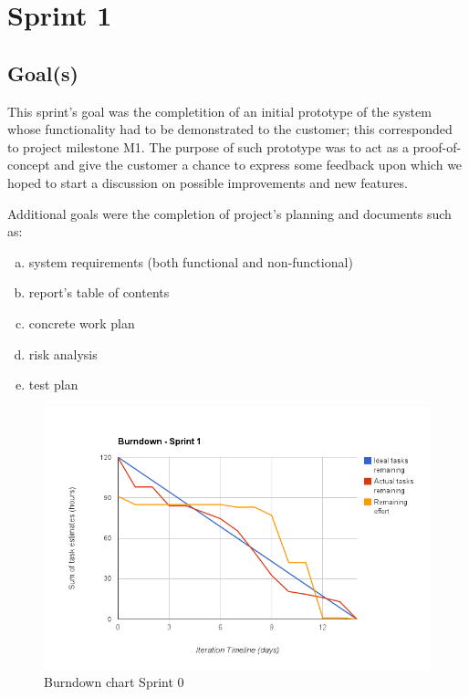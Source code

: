 
\chapter{Sprint 1}
\label{Sprint1}

\section{Goal(s)}

This sprint's goal was the completition of an initial prototype of the system whose functionality
had to be demonstrated to the customer; this corresponded to project milestone M1.
The purpose of such prototype was to act as a proof-of-concept and give the customer
a chance to express some feedback upon which we hoped to start a discussion
on possible improvements and new features.

Additional goals were the completion of project's planning and documents such as:
\begin{enumerate}[a)]
\item system requirements (both functional and non-functional)
\item report's table of contents
\item concrete work plan
\item risk analysis
\item test plan
\end{enumerate}

\begin{figure}[h]
\centering
\includegraphics[scale=0.60]{../Figures/burndownSprint1.png}
\caption{Burndown chart Sprint 0}
\label{figure:burndownsprint0}
\end{figure}

